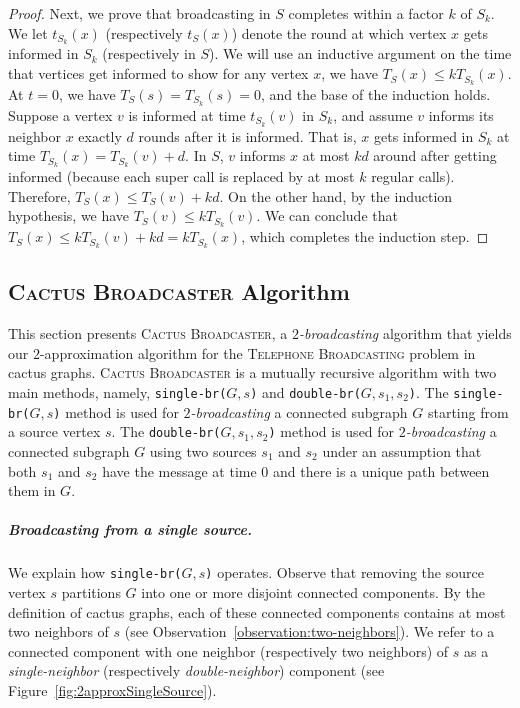 \documentclass[letterpaper,11pt]{article}
\newcommand{\twofast}{\textit{$2$-broadcasting}\xspace}
\newcommand{\telebr}{\textsc{Telephone Broadcasting}\xspace}
\newcommand{\singlefunc}[1]{\texttt{single-br(#1)}\xspace}
\newcommand{\doublefunc}[1]{\texttt{double-br(#1)}\xspace}
\newcommand{\ouralgo}{\textsc{Cactus Broadcaster}\xspace}
\begin{document}
\begin{proof}
Next, we prove that broadcasting in $S$ completes within a factor $k$ of $S_k$. 
We let $t_{S_k}(x)$ (respectively $t_{S}(x)$) denote the round at which vertex $x$ gets informed in $S_k$ (respectively in $S$). 
We will use an inductive argument on the time that vertices get informed to show for any vertex $x$, we have $T_{S}(x) \leq k T_{S_k}(x)$. 
At $t=0$, we have 
$T_{S}(s) =  T_{S_k}(s) = 0$, and the base of the induction holds. Suppose a vertex $v$ is informed at time $t_{S_k}(v)$ in $S_k$, and 
assume $v$ informs its neighbor $x$ exactly $d$ rounds after it is informed. That is, $x$ gets informed in $S_k$ at time $T_{S_k}(x) = T_{S_k}(v) + d$. In $S$, $v$ informs $x$ at most $kd$ around after getting informed (because each super call is replaced by at most $k$ regular calls). 
Therefore, $T_{S}(x) \leq T_{S}(v) + kd$. On the other hand, by the induction hypothesis, we have $T_{S}(v) \leq k T_{S_k}(v)$. We can conclude that $T_{S}(x) \leq k T_{S_k}(v) + kd = k T_{S_k}(x)$, which completes the induction step.
\end{proof}


\subsection{\ouralgo Algorithm}
This section presents \ouralgo, a \twofast algorithm 
that yields our $2$-approximation algorithm for the \telebr problem in cactus graphs. 
\ouralgo is a mutually recursive algorithm with two main methods, namely, 
    \singlefunc{$G, s$} and
    \doublefunc{$G, s_1, s_2$}.
The \singlefunc{$G, s$} method is used for \twofast a connected subgraph $G$ starting from a source vertex $s$. The \doublefunc{$G, s_1, s_2$} method is used for \twofast a connected subgraph $G$ using two sources $s_1$ and $s_2$ under an assumption that both $s_1$ and $s_2$ have the message at time $0$ and there is a unique path between them in $G$.  


\subparagraph*{Broadcasting from a single source.}
We explain how \singlefunc{$G, s$} operates. Observe that removing the source vertex $s$ partitions $G$ into one or more disjoint connected components. By the definition of cactus graphs, each of these connected components contains at most two neighbors of $s$ 
(see Observation~\ref{observation:two-neighbors}). We refer to a connected component with one neighbor (respectively two neighbors) of $s$ as a \emph{single-neighbor} (respectively \emph{double-neighbor}) component (see Figure~\ref{fig:2approxSingleSource}).
\end{document}
